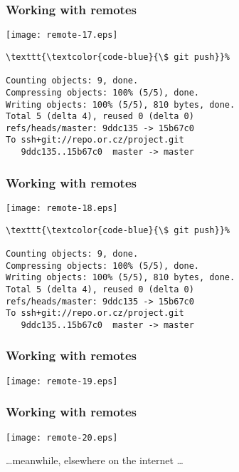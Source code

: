\documentclass[english]{beamer}
\newcommand{\CMD}[1]{%
\texttt{\textcolor{code-blue}{#1}}%
}
\begin{document}
\begin{frame}[fragile]
\frametitle{Working with remotes}

\texttt{[image: remote-17.eps]}

{\tiny
\begin{Verbatim}[commandchars=\\\{\}]
\CMD{\$ git push}
Counting objects: 9, done.
Compressing objects: 100% (5/5), done.
Writing objects: 100% (5/5), 810 bytes, done.
Total 5 (delta 4), reused 0 (delta 0)
refs/heads/master: 9ddc135 -> 15b67c0
To ssh+git://repo.or.cz/project.git
   9ddc135..15b67c0  master -> master
\end{Verbatim}
}
\vspace{\textheight}
\end{frame}

\begin{frame}[fragile]
\frametitle{Working with remotes}

\texttt{[image: remote-18.eps]}

{\tiny
\begin{Verbatim}[commandchars=\\\{\}]
\CMD{\$ git push}
Counting objects: 9, done.
Compressing objects: 100% (5/5), done.
Writing objects: 100% (5/5), 810 bytes, done.
Total 5 (delta 4), reused 0 (delta 0)
refs/heads/master: 9ddc135 -> 15b67c0
To ssh+git://repo.or.cz/project.git
   9ddc135..15b67c0  master -> master
\end{Verbatim}
}
\vspace{\textheight}
\end{frame}

\begin{frame}[fragile]
\frametitle{Working with remotes}

\texttt{[image: remote-19.eps]}

\vspace{\textheight}
\end{frame}

\begin{frame}[fragile]
\frametitle{Working with remotes}

\texttt{[image: remote-20.eps]}

\begin{center}
\ldots meanwhile, elsewhere on the internet \ldots
\end{center}

\vspace{\textheight}
\end{frame}
\end{document}

